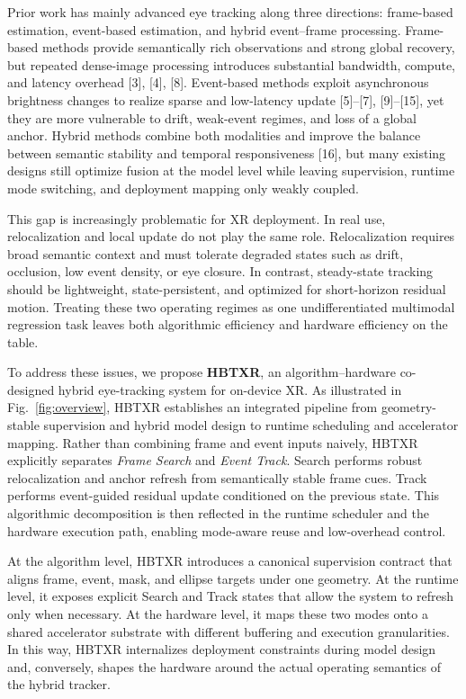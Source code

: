 \documentclass[journal]{IEEEtran}
\begin{document}
Prior work has mainly advanced eye tracking along three directions: frame-based estimation, event-based estimation, and hybrid event--frame processing. Frame-based methods provide semantically rich observations and strong global recovery, but repeated dense-image processing introduces substantial bandwidth, compute, and latency overhead [3], [4], [8]. Event-based methods exploit asynchronous brightness changes to realize sparse and low-latency update [5]--[7], [9]--[15], yet they are more vulnerable to drift, weak-event regimes, and loss of a global anchor. Hybrid methods combine both modalities and improve the balance between semantic stability and temporal responsiveness [16], but many existing designs still optimize fusion at the model level while leaving supervision, runtime mode switching, and deployment mapping only weakly coupled.

This gap is increasingly problematic for XR deployment. In real use, relocalization and local update do not play the same role. Relocalization requires broad semantic context and must tolerate degraded states such as drift, occlusion, low event density, or eye closure. In contrast, steady-state tracking should be lightweight, state-persistent, and optimized for short-horizon residual motion. Treating these two operating regimes as one undifferentiated multimodal regression task leaves both algorithmic efficiency and hardware efficiency on the table.

To address these issues, we propose \textbf{HBTXR}, an algorithm--hardware co-designed hybrid eye-tracking system for on-device XR. As illustrated in Fig.~\ref{fig:overview}, HBTXR establishes an integrated pipeline from geometry-stable supervision and hybrid model design to runtime scheduling and accelerator mapping. Rather than combining frame and event inputs naively, HBTXR explicitly separates \emph{Frame Search} and \emph{Event Track}. Search performs robust relocalization and anchor refresh from semantically stable frame cues. Track performs event-guided residual update conditioned on the previous state. This algorithmic decomposition is then reflected in the runtime scheduler and the hardware execution path, enabling mode-aware reuse and low-overhead control.

At the algorithm level, HBTXR introduces a canonical supervision contract that aligns frame, event, mask, and ellipse targets under one geometry. At the runtime level, it exposes explicit Search and Track states that allow the system to refresh only when necessary. At the hardware level, it maps these two modes onto a shared accelerator substrate with different buffering and execution granularities. In this way, HBTXR internalizes deployment constraints during model design and, conversely, shapes the hardware around the actual operating semantics of the hybrid tracker.
\end{document}
